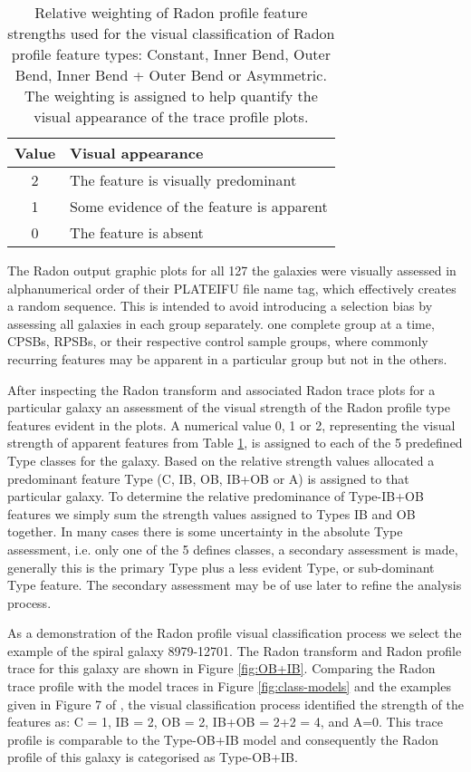 \begin{table}
    \caption[Relative weighting of Radon profile feature strengths used in visual classification]{Relative weighting of Radon profile feature strengths used for the visual classification of Radon profile feature types: Constant, Inner Bend, Outer Bend, Inner Bend + Outer Bend or Asymmetric. The weighting is assigned to help quantify the visual appearance of the trace profile plots.}
    \label{tab:features}
    \centering
    \begin{tabular}{cl}
    \hline
    Value & Visual appearance \\
    \hline
    2 & The feature is visually predominant \\
    1 & Some evidence of the feature is apparent \\
    0 & The feature is absent \\
    \hline
    \end{tabular}
\end{table}

The Radon output graphic plots for all 127 the galaxies were visually assessed in alphanumerical order of their PLATEIFU file name tag, which effectively creates a random sequence. This is intended to avoid introducing a selection bias by assessing all galaxies in each group separately. one complete group at a time, CPSBs, RPSBs, or their respective control sample groups, where commonly recurring features may be apparent in a particular group but not in the others.

After inspecting the Radon transform and associated Radon trace plots for a particular galaxy an assessment of the visual strength of the Radon profile type features evident in the plots. A numerical value 0, 1 or 2, representing the visual strength of apparent features from Table \ref{tab:features}, is assigned to each of the 5 predefined Type classes for the galaxy. Based on the relative strength values allocated a predominant feature Type (C, IB, OB, IB+OB or A) is assigned to that particular galaxy. To determine the relative predominance of Type-IB+OB features we simply sum the strength values assigned to Types IB and OB together. 
In many cases there is some uncertainty in the absolute Type assessment, i.e. only one of the 5 defines classes, a secondary assessment is made,  generally this is the primary Type plus a less evident Type, or sub-dominant Type feature. The secondary assessment may be of use later to refine the analysis process.

As a demonstration of the Radon profile visual classification process we select the example of the spiral galaxy 8979-12701. The Radon transform and Radon profile trace for this galaxy are shown in Figure \ref{fig:OB+IB}. Comparing the Radon trace profile with the model traces in Figure \ref{fig:class-models} and the examples given in  Figure 7 of \cite{2018MNRAS.480.2217S}, the visual classification process identified the strength of the features as: C = 1, IB = 2, OB = 2, IB+OB = 2+2 = 4, and A=0. This trace profile is comparable to the Type-OB+IB model and consequently the Radon profile of this galaxy is categorised as Type-OB+IB.

